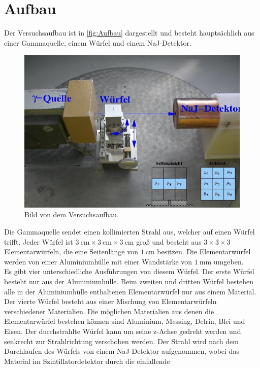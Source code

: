\section{Aufbau}
\label{sec:Aufbau}
Der Versuchsaufbau ist in \autoref{fig:Aufbau} dargestellt und besteht hauptsächlich aus einer Gammaquelle, einem Würfel und einem NaJ-Detektor.
\begin{figure}[H]
    \centering
    \includegraphics[scale=0.7]{Abbildungen/Aufbau.png}
    \caption{Bild von dem Versuchsaufbau.\cite{V14}}
    \label{fig:Aufbau}
\end{figure}
Die Gammaquelle sendet einen kollimierten Strahl aus, welcher auf einen Würfel trifft. 
Jeder Würfel ist $\qty{3}{\centi\meter} \times \qty{3}{\centi\meter} \times \qty{3}{\centi\meter}$ groß und besteht aus $3 \times 3 \times 3$
Elementarwürfeln, die eine Seitenlänge von $\qty{1}{\centi\meter}$ besitzen. Die Elementarwürfel werden von einer Aluminiumhülle mit einer
Wandstärke von $\qty{1}{\milli\meter}$ umgeben.\\
Es gibt vier unterschiedliche Ausführungen von diesem Würfel. Der erste Würfel besteht nur aus der Aluminiumhülle.
Beim zweiten und dritten Würfel bestehen alle in der Aluminiumhülle enthaltenen Elementarwürfel nur aus einem Material. Der vierte Würfel besteht aus
einer Mischung von Elementarwürfeln verschiedener Materialien.
Die möglichen Materialien aus denen die Elementarwürfel bestehen können sind Aluminium, Messing, Delrin, Blei und Eisen.
Der durchstrahlte Würfel kann um seine z-Achse gedreht werden und senkrecht zur Strahlrichtung verschoben werden.
Der Strahl wird nach dem Durchlaufen des Würfels von einem NaJ-Detektor aufgenommen, wobei das Material im Szintillatordetektor durch die einfallende
